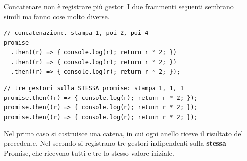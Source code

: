 \begin{warningbox}{{Concatenare non è registrare più gestori}}
  I due frammenti seguenti sembrano simili ma fanno cose molto diverse.

\begin{affianco}[0.6][c]
\begin{lstlisting}[style=js]
// concatenazione: stampa 1, poi 2, poi 4
promise
  .then((r) => { console.log(r); return r * 2; })
  .then((r) => { console.log(r); return r * 2; })
  .then((r) => { console.log(r); return r * 2; });
\end{lstlisting}
\risultato
\begin{immagine}
\end{immagine}
\end{affianco}

\begin{affianco}[0.6][c]
\begin{lstlisting}[style=js]
// tre gestori sulla STESSA promise: stampa 1, 1, 1
promise.then((r) => { console.log(r); return r * 2; });
promise.then((r) => { console.log(r); return r * 2; });
promise.then((r) => { console.log(r); return r * 2; });
\end{lstlisting}
\risultato
\begin{immagine}
\end{immagine}
\end{affianco}

  Nel primo caso si costruisce una catena, in cui ogni anello riceve il
  risultato del precedente. Nel secondo si registrano tre gestori indipendenti
  sulla \textbf{stessa} Promise, che ricevono tutti e tre lo stesso valore
  iniziale.
\end{warningbox}

